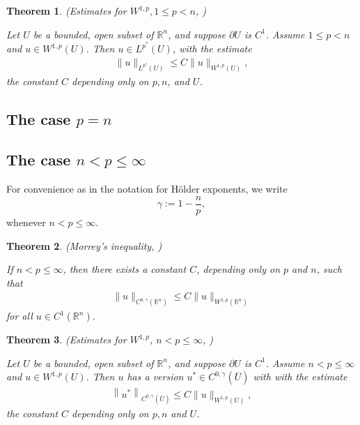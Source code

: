 \documentclass[11pt,a4paper]{report}
\newtheorem{theorem}{Theorem}[section]
\theoremstyle{definition}
\begin{document}
\begin{theorem}  
    \emph{(Estimates for $W^{1, p}, 1 \leq p < n$, \cite{2010_Evans})}

    Let $U$ be a bounded, open subset of $\mathbb{R}^n$, and suppose $\partial U$ is $C^1$. 
    Assume $1 \leq p < n$ and $u \in W^{1, p}(U)$. 
    Then $u \in L^{p^*}(U)$, with the estimate
    \begin{align*}
    \|u\|_{L^{p^*}(U)} \leq C\|u\|_{W^{1, p}(U)},
    \end{align*}
    the constant $C$ depending only on $p, n$, and $U$.
\end{theorem}

\subsection{The case $p=n$}

\subsection{The case $n < p \leq \infty$}

For convenience as in the notation for H\"{o}lder exponents, we write 
\begin{equation*} 
    \gamma := 1- \frac{n}{p},
\end{equation*}
whenever $n < p \leq \infty$.

\begin{theorem}
    \emph{(Morrey's inequality, \cite{2010_Evans})}

    If $n < p \leq \infty$, then there exists a constant $C$, depending only on $p$ and $n$, such that
    \begin{align*}
    \|u\|_{C^{0, \gamma}\left(\mathbb{R}^n\right)} \leq C\|u\|_{W^{1, p}\left(\mathbb{R}^n\right)}
    \end{align*}
    for all $u \in C^1\left(\mathbb{R}^n\right)$.
\end{theorem}

\begin{theorem}
    \emph{(Estimates for $W^{1, p}$, $n<p \leq \infty$, \cite{2010_Evans})}

    Let $U$ be a bounded, open subset of $\mathbb{R}^n$, and suppose $\partial U$ is $C^1$. Assume $n < p \leq \infty$ and $u \in W^{1, p}(U)$. 
    Then $u$ has a version $u^{\ast} \in C^{0, \gamma}(\overline{U})$ with with the estimate
    \begin{align*}
        \left\|u^*\right\|_{C^{0, \gamma}(\bar{U})} \leq C\|u\|_{W^{1, p}(U)},
    \end{align*}
    the constant $C$ depending only on $p, n$ and $U$.
\end{theorem}
\end{document}

